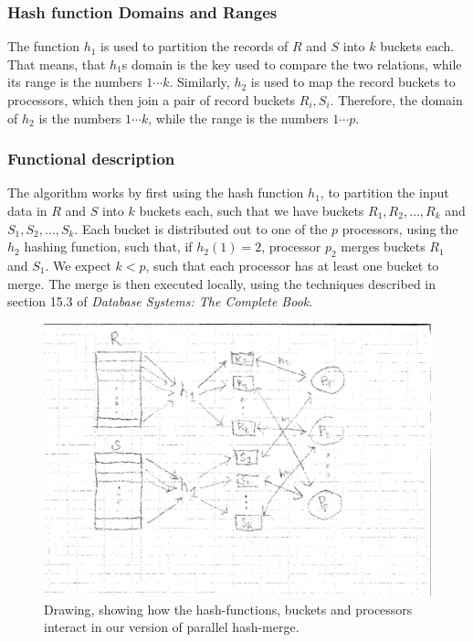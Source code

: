 \documentclass[a4paper, 12pt]{article}
\begin{document}
\subsubsection*{Hash function Domains and Ranges}

The function $h_1$ is used to partition the records of $R$ and $S$
into $k$ buckets each. That means, that $h_1$s domain is the key used
to compare the two relations, while its range is the numbers $1\cdots
k$. Similarly, $h_2$ is used to map the record buckets to processors,
which then join a pair of record buckets $R_i, S_i$. Therefore, the
domain of $h_2$ is the numbers $1 \cdots k$, while the range is the
numbers $1 \cdots p$.

\subsubsection*{Functional description}

The algorithm works by first using the hash function $h_1$, to
partition the input data in $R$ and $S$ into $k$ buckets each, such
that we have buckets $R_1, R_2, \ldots, R_k$ and $S_1, S_2, \dots,
S_k$. Each bucket is distributed out to one of the $p$ processors,
using the $h_2$ hashing function, such that, if $h_2(1) = 2$,
processor $p_2$ merges buckets $R_1$ and $S_1$. We expect $k<p$, such
that each processor has at least one bucket to merge. The merge is
then executed locally, using the techniques described in section 15.3
of \emph{Database Systems: The Complete Book}.

\begin{figure}
  \center
  \includegraphics[scale=0.6]{parallelmerge.eps}
  \caption{Drawing, showing how the hash-functions, buckets and
    processors interact in our version of parallel hash-merge.}
\end{figure}
\end{document}
